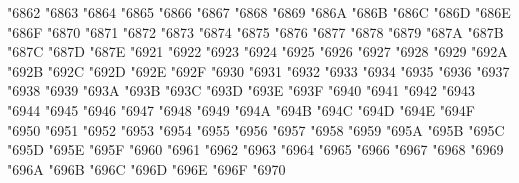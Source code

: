 {\Uchar\jis"6862 %
\Uchar\jis"6863 %
\Uchar\jis"6864 %
\Uchar\jis"6865 %
\Uchar\jis"6866 %
\Uchar\jis"6867 %
\Uchar\jis"6868 %
\Uchar\jis"6869 %
\Uchar\jis"686A %
\Uchar\jis"686B %
\Uchar\jis"686C %
\Uchar\jis"686D %
\Uchar\jis"686E %
\Uchar\jis"686F %
\Uchar\jis"6870 %
\Uchar\jis"6871 %
\Uchar\jis"6872 %
\Uchar\jis"6873 %
\Uchar\jis"6874 %
\Uchar\jis"6875 %
\Uchar\jis"6876 %
\Uchar\jis"6877 %
\Uchar\jis"6878 %
\Uchar\jis"6879 %
\Uchar\jis"687A %
\Uchar\jis"687B %
\Uchar\jis"687C %
\Uchar\jis"687D %
\Uchar\jis"687E %
\Uchar\jis"6921 %
\Uchar\jis"6922 %
\Uchar\jis"6923 %
\Uchar\jis"6924 %
\Uchar\jis"6925 %
\Uchar\jis"6926 %
\Uchar\jis"6927 %
\Uchar\jis"6928 %
\Uchar\jis"6929 %
\Uchar\jis"692A %
\Uchar\jis"692B %
\Uchar\jis"692C %
\Uchar\jis"692D %
\Uchar\jis"692E %
\Uchar\jis"692F %
\Uchar\jis"6930 %
\Uchar\jis"6931 %
\Uchar\jis"6932 %
\Uchar\jis"6933 %
\Uchar\jis"6934 %
\Uchar\jis"6935 %
\Uchar\jis"6936 %
\Uchar\jis"6937 %
\Uchar\jis"6938 %
\Uchar\jis"6939 %
\Uchar\jis"693A %
\Uchar\jis"693B %
\Uchar\jis"693C %
\Uchar\jis"693D %
\Uchar\jis"693E %
\Uchar\jis"693F %
\Uchar\jis"6940 %
\Uchar\jis"6941 %
\Uchar\jis"6942 %
\Uchar\jis"6943 %
\Uchar\jis"6944 %
\Uchar\jis"6945 %
\Uchar\jis"6946 %
\Uchar\jis"6947 %
\Uchar\jis"6948 %
\Uchar\jis"6949 %
\Uchar\jis"694A %
\Uchar\jis"694B %
\Uchar\jis"694C %
\Uchar\jis"694D %
\Uchar\jis"694E %
\Uchar\jis"694F %
\Uchar\jis"6950 %
\Uchar\jis"6951 %
\Uchar\jis"6952 %
\Uchar\jis"6953 %
\Uchar\jis"6954 %
\Uchar\jis"6955 %
\Uchar\jis"6956 %
\Uchar\jis"6957 %
\Uchar\jis"6958 %
\Uchar\jis"6959 %
\Uchar\jis"695A %
\Uchar\jis"695B %
\Uchar\jis"695C %
\Uchar\jis"695D %
\Uchar\jis"695E %
\Uchar\jis"695F %
\Uchar\jis"6960 %
\Uchar\jis"6961 %
\Uchar\jis"6962 %
\Uchar\jis"6963 %
\Uchar\jis"6964 %
\Uchar\jis"6965 %
\Uchar\jis"6966 %
\Uchar\jis"6967 %
\Uchar\jis"6968 %
\Uchar\jis"6969 %
\Uchar\jis"696A %
\Uchar\jis"696B %
\Uchar\jis"696C %
\Uchar\jis"696D %
\Uchar\jis"696E %
\Uchar\jis"696F %
\Uchar\jis"6970 %
}
